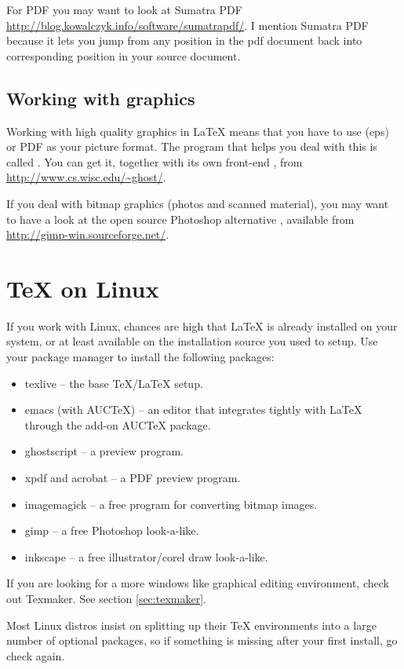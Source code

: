 For PDF you may want to look at Sumatra
PDF \url{http://blog.kowalczyk.info/software/sumatrapdf/}. I mention Sumatra PDF
because it lets you jump from any position in the pdf document back into
corresponding position in your source document.

\subsection{Working with graphics}

Working with high quality graphics in \LaTeX{} means that you have to use
\EPSi{} (eps) or PDF as your picture format. The program that helps you
deal with this is called . You can get it, together with its
own front-end , from \url{http://www.cs.wisc.edu/~ghost/}.

If you deal with bitmap graphics (photos and scanned material), you may want
to have a look at the open source Photoshop alternative , available
from \url{http://gimp-win.sourceforge.net/}.

\section{\TeX{} on Linux}

If you work with Linux, chances are high that \LaTeX{} is already installed
on your system, or at least available on the installation source you used to
setup. Use your package manager to install the following packages:

\begin{itemize}
\item texlive -- the base \TeX{}/\LaTeX{} setup.
\item emacs (with AUCTeX) -- an editor that integrates tightly with \LaTeX{} through the add-on AUCTeX package.
\item ghostscript -- a \PSi{} preview program.
\item xpdf and acrobat -- a PDF preview program.
\item imagemagick -- a free program for converting bitmap images.
\item gimp -- a free Photoshop look-a-like.
\item inkscape -- a free illustrator/corel draw look-a-like.
\end{itemize}

If you are looking for a more windows like graphical editing environment,
check out Texmaker. See section \ref{sec:texmaker}.

Most Linux distros insist on splitting up their \TeX{} environments into a
large number of optional packages, so if something is missing after your
first install, go check again.
